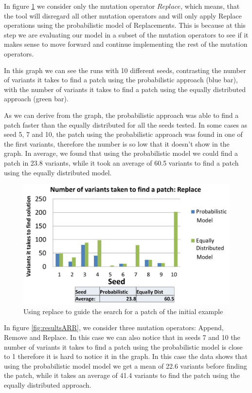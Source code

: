 \documentclass[conference]{IEEEtran}
\begin{document}
In figure \ref{fig:resultsReplace} we consider only the mutation operator 
$Replace$, which means, that the tool will disregard all other mutation 
operators and will only apply Replace operations using the probabilistic model 
of Replacements. This is because at this step we are evaluating our model in a 
subset of the mutation operators to see if it makes sense to move forward and 
continue implementing the rest of the mutation operators.

In this graph we can see the runs with 10 different seeds, contrasting the 
number of variants it takes to find a patch using the probabilistic approach 
(blue bar), with the number of variants it takes to find a patch using the 
equally distributed approach (green bar). 

As we can derive from the graph, the probabilistic approach was able to find a 
patch faster than the equally distributed for all the seeds tested. In some 
cases as seed 5, 7 and 10, the patch using the probabilistic approach was found 
in one of the first variants, therefore the number is so low that it doesn't 
show in the graph. In average, we found that using the probabilistic model we 
could find a patch in 23.8 variants, while it took an average of 60.5 variants 
to find a patch using the equally distributed model.

\begin{figure}[!h]
  \centering
    \includegraphics[scale=0.25]{sanity3}
  \caption{Using replace to guide the search for a patch of the initial example}
  \label{fig:resultsReplace}
\end{figure}

In figure \ref{fig:resultsARR}, we consider three mutation operators: Append, 
Remove and Replace. In this case we can also notice that in seeds 7 and 10 the 
number of variants it takes to find a patch using the probabilistic model is 
close to 1 therefore it is hard to notice it in the graph. In this case the data 
shows that using the probabilistic model model we get a mean of 22.6 variants 
before finding the patch, while it takes an average of 41.4 variants to find the 
patch using the equally distributed approach.
\end{document}
